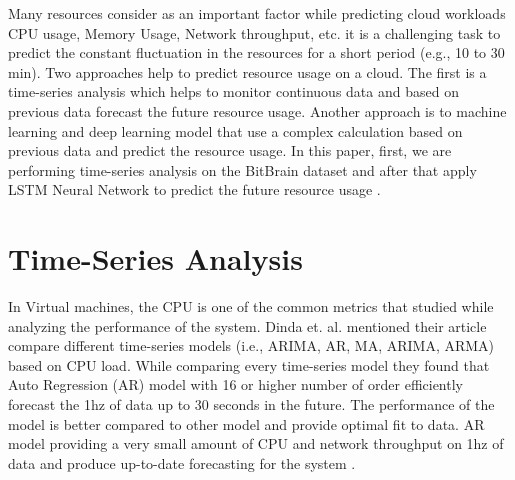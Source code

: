 Many resources consider as an important factor while predicting cloud workloads CPU usage, Memory Usage, Network throughput, etc. it is a challenging task to predict the constant fluctuation in the resources for a short period (e.g., 10 to 30 min). Two approaches help to predict resource usage on a cloud. The first is a time-series analysis which helps to monitor continuous data and based on previous data forecast the future resource usage. Another approach is to machine learning and deep learning model that use a complex calculation based on previous data and predict the resource usage. In this paper, first, we are performing time-series analysis on the BitBrain dataset and after that apply LSTM Neural Network to predict the future resource usage \cite{kumar2018workload}.
 
\section{Time-Series Analysis}
 
In Virtual machines, the CPU is one of the common metrics that studied while analyzing the performance of the system. Dinda et. al. mentioned their article compare different time-series models (i.e., ARIMA, AR, MA, ARIMA, ARMA) based on CPU load. While comparing every time-series model they found that Auto Regression (AR) model with 16 or higher number of order efficiently forecast the 1hz of data up to 30 seconds in the future. The performance of the model is better compared to other model and provide optimal fit to data. AR model providing a very small amount of CPU and network throughput on 1hz of data and produce up-to-date forecasting for the system \cite{dinda2000host}.

